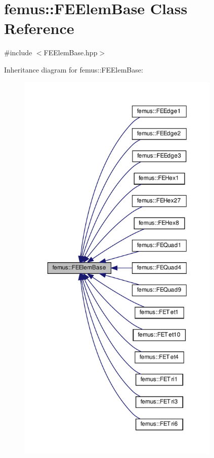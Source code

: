 \hypertarget{classfemus_1_1_f_e_elem_base}{}\section{femus\+:\+:F\+E\+Elem\+Base Class Reference}
\label{classfemus_1_1_f_e_elem_base}


{\ttfamily \#include $<$F\+E\+Elem\+Base.\+hpp$>$}



Inheritance diagram for femus\+:\+:F\+E\+Elem\+Base\+:
\nopagebreak
\begin{figure}[H]
\begin{center}
\leavevmode
\includegraphics[height=550pt]{classfemus_1_1_f_e_elem_base__inherit__graph}
\end{center}
\end{figure}
